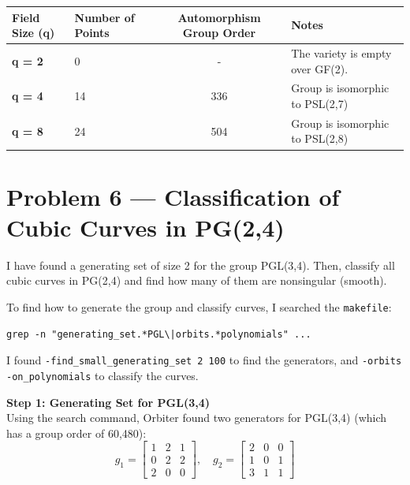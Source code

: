 \documentclass[12pt,a4paper]{article}
\begin{document}
\begin{table}[h]
\centering
\begin{tabular}{llcl}
\toprule
\textbf{Field Size (q)} & \textbf{Number of Points} & \textbf{Automorphism Group Order} & \textbf{Notes} \\
\midrule
\textbf{q = 2} & 0 & - & The variety is empty over GF(2). \\
\textbf{q = 4} & 14 & 336 & Group is isomorphic to PSL(2,7) \\
\textbf{q = 8} & 24 & 504 & Group is isomorphic to PSL(2,8) \\
\bottomrule
\end{tabular}
\end{table}

\newpage

\section*{Problem 6 --- Classification of Cubic Curves in PG(2,4)}

I have found a generating set of size 2 for the group PGL(3,4). Then, classify all cubic curves in PG(2,4) and find how many of them are nonsingular (smooth).

To find how to generate the group and classify curves, I searched the \texttt{makefile}:
\begin{verbatim}
grep -n "generating_set.*PGL\|orbits.*polynomials" ...
\end{verbatim}
I found \texttt{-find\_small\_generating\_set 2 100} to find the generators, and \texttt{-orbits -on\_polynomials} to classify the curves.

\vspace{0.3cm}\noindent\textbf{Step 1: Generating Set for PGL(3,4)}\\
Using the search command, Orbiter found two generators for PGL(3,4) (which has a group order of 60,480):
\[
g_1 = \begin{bmatrix} 1 & 2 & 1 \\ 0 & 2 & 2 \\ 2 & 0 & 0 \end{bmatrix}, \quad g_2 = \begin{bmatrix} 2 & 0 & 0 \\ 1 & 0 & 1 \\ 3 & 1 & 1 \end{bmatrix}
\]
\end{document}
